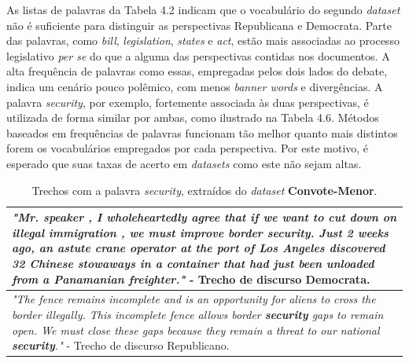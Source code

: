 As listas de palavras da Tabela 4.2 indicam que o vocabulário do segundo \emph{dataset} não é suficiente para distinguir as perspectivas Republicana e Democrata. Parte das palavras, como \emph{bill}, \emph{legislation}, \emph{states} e \emph{act}, estão mais associadas ao processo legislativo \emph{per se} do que a alguma das perspectivas contidas nos documentos. A alta frequência de palavras como essas, empregadas pelos dois lados do debate, indica um cenário pouco polêmico, com menos \emph{banner words} e divergências. A palavra \emph{security}, por exemplo, fortemente associada às duas perspectivas, é utilizada de forma similar por ambas, como ilustrado na Tabela 4.6. Métodos baseados em frequências de palavras funcionam tão melhor quanto mais distintos forem os vocabulários empregados por cada perspectiva. Por este motivo, é esperado que suas taxas de acerto em \emph{datasets} como este não sejam altas.

\begin{table}[t]
\centering
\begin{tabular}{| p{10cm} | }
\hline

\emph{"Mr. speaker , I wholeheartedly agree that if we want to cut down on illegal immigration , we must improve border \textbf{security}. Just 2 weeks ago, an astute crane operator at the port of Los Angeles discovered 32 Chinese stowaways in a container that had just been unloaded from a Panamanian freighter."} - Trecho de discurso Democrata. \\ \hline


\emph{"The fence remains incomplete and is an opportunity for aliens to cross the border illegally. This incomplete fence allows border \textbf{security} gaps to remain open.  We must close these gaps because they remain a threat to our national \textbf{security}."} - Trecho de discurso Republicano. \\ \hline
\end{tabular}
\label{6}
\caption{Trechos com a palavra \emph{security}, extraídos do \emph{dataset} \textbf{Convote-Menor}.}
\end{table}





